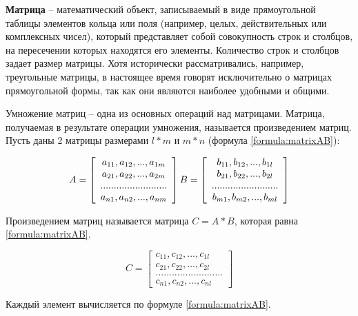 \textbf{Матрица} -- математический объект, записываемый в виде прямоугольной таблицы элементов кольца или поля
(например, целых, действительных или комплексных чисел), который представляет собой совокупность строк и столбцов, 
на пересечении которых находятся его элементы. Количество строк и столбцов задает размер матрицы. Хотя исторически 
рассматривались, например, треугольные матрицы, в настоящее время говорят исключительно о матрицах прямоугольной формы, 
так как они являются наиболее удобными и общими. 

Умножение матриц -- одна из основных операций над матрицами. Матрица, получаемая в результате операции умножения, 
называется произведением матриц. Пусть даны 2 матрицы размерами $l*m$ и $m*n$ (формула \ref{formula:matrixAB}):


\begin{equation}
  A = 
  \left[
    \begin{array}{ccc}
      a_{11}, a_{12}, ..., a_{1m}\\
      a_{21}, a_{22}, ..., a_{2m}\\
      .........................  \\
      a_{n1}, a_{n2}, ..., a_{nm}
    \end{array}
  \right]
\\ 
  B = 
  \left[
    \begin{array}{ccc}
      b_{11}, b_{12}, ..., b_{1l}\\
      b_{21}, b_{22}, ..., b_{2l}\\
      .........................  \\
      b_{m1}, b_{m2}, ..., b_{ml}
    \end{array}
  \right]
\end{equation} \label{formula:matrixAB}


Произведением матриц называется матрица $C=A*B$, которая равна \ref{formula:matrixAB}.

\begin{equation}
  C = 
  \left[
    \begin{array}{ccc}
      c_{11}, c_{12}, ..., c_{1l}\\
      c_{21}, c_{22}, ..., c_{2l}\\
      .........................  \\
      c_{n1}, c_{n2}, ..., c_{nl}
    \end{array}
  \right]
\end{equation}\label{formula:matrixC}


Каждый элемент вычисляется по формуле \ref{formula:matrixAB}.

